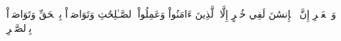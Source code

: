 وَٱلۡعَصۡرِ
إِنَّ ٱلۡإِنسَٰنَ لَفِي خُسۡرٍ
إِلَّا ٱلَّذِينَ ءَامَنُواْ وَعَمِلُواْ ٱلصَّـٰلِحَٰتِ وَتَوَاصَوۡاْ بِٱلۡحَقِّ وَتَوَاصَوۡاْ بِٱلصَّبۡرِ